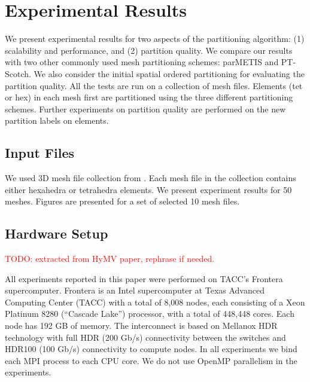 \documentclass[conference]{IEEEtran}
\begin{document}

\section{Experimental Results}
We present experimental results for two aspects of the partitioning algorithm: (1) scalability and performance, and (2) partition quality. We compare our results with two other commonly used mesh partitioning schemes: parMETIS and PT-Scotch. We also consider the initial spatial ordered partitioning for evaluating the partition quality. All the tests are run on a collection of mesh files. Elements (tet or hex) in each mesh first are partitioned using the three different partitioning schemes. Further experiments on partition quality are performed on the new partition labels on elements.


\subsection{Input Files}
We used 3D mesh file collection from \cite{meshes}. Each mesh file in the collection contains either hexahedra or tetrahedra elements. We present experiment results for 50 meshes. Figures are presented for a set of selected 10 mesh files.


\subsection{Hardware Setup}
\textcolor{red}{\textcolor{red}{TODO}: extracted from HyMV paper, rephrase if needed.}

All experiments reported in this paper were performed on TACC's Frontera \cite{Frontera} supercomputer. Frontera is an Intel supercomputer at Texas Advanced Computing Center (TACC) with a total of 8,008 nodes, each consisting of a Xeon Platinum 8280 (“Cascade Lake”) processor, with a total of 448,448 cores. Each node has 192 GB of memory. The interconnect is based on Mellanox HDR technology with full HDR (200 Gb/s) connectivity between the switches and HDR100 (100 Gb/s) connectivity to compute nodes. In all experiments we bind each MPI process to each CPU core. We do not use OpenMP parallelism in the experiments.
\end{document}
